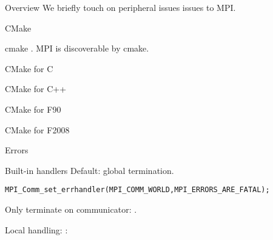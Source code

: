 
\begin{numberedframe}{Overview}
  We briefly touch on peripheral issues issues to MPI.
\end{numberedframe}

 {CMake}

\begin{numberedframe}{cmake}
  \label{sl:mpi-cmake}.
  MPI is discoverable by cmake.
\end{numberedframe}

\begin{c}
  \begin{numberedframe}{CMake for C}
    
  \end{numberedframe}
\end{c}

\begin{cxx}
  \begin{numberedframe}{CMake for C++}
    
  \end{numberedframe}
\end{cxx}

\begin{fortran}
\begin{numberedframe}{CMake for F90}

\end{numberedframe}
\end{fortran}

\begin{fortran}
\begin{numberedframe}{CMake for F2008}

\end{numberedframe}
\end{fortran}

 {Errors}

\begin{numberedframe}{Built-in handlers}
  \label{sl:errhandler}
Default: global termination.
\begin{lstlisting}
MPI_Comm_set_errhandler(MPI_COMM_WORLD,MPI_ERRORS_ARE_FATAL);
\end{lstlisting}

\begin{mpifour}
  Only terminate on communicator: .
\end{mpifour}
  
Local handling: :
\end{numberedframe}

